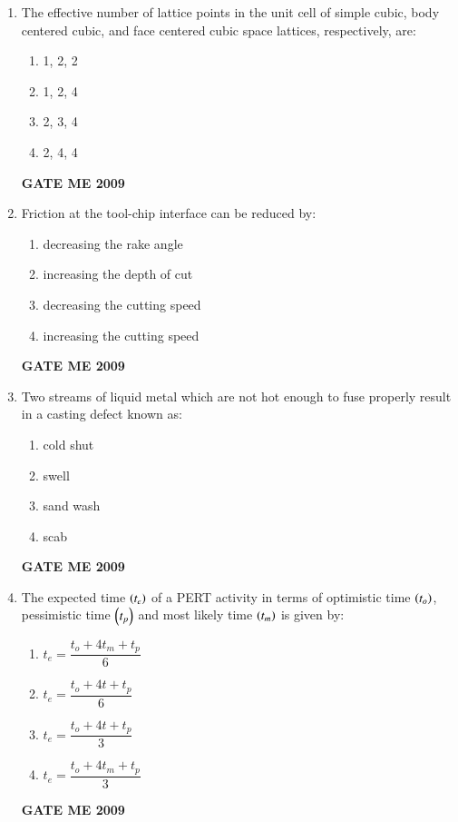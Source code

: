 \documentclass[journal]{IEEEtran}
\begin{document}
\begin{enumerate}[leftmargin=0pt]
\item The effective number of lattice points in the unit cell of simple cubic, body centered cubic, and face centered cubic space lattices, respectively, are:
  \begin{enumerate}[label=(\alph*)]
    \item 1, 2, 2
    \item 1, 2, 4
    \item 2, 3, 4
    \item 2, 4, 4
  \end{enumerate}
  \hfill{\textbf{GATE ME 2009}}


\item Friction at the tool-chip interface can be reduced by:
  \begin{enumerate}[label=(\alph*)]
    \item decreasing the rake angle
    \item increasing the depth of cut
    \item decreasing the cutting speed
    \item increasing the cutting speed
  \end{enumerate}
  \hfill{\textbf{GATE ME 2009}}


\item Two streams of liquid metal which are not hot enough to fuse properly result in a casting defect known as:
  \begin{enumerate}[label=(\alph*)]
    \item cold shut
    \item swell
    \item sand wash
    \item scab
  \end{enumerate}
  \hfill{\textbf{GATE ME 2009}}


\item The expected time $\left(t_e\right)$ of a PERT activity in terms of optimistic time $\left(t_o\right)$, pessimistic time $\left(t_p\right)$ and most likely time $\left(t_m\right)$ is given by:
  \begin{enumerate}[label=(\alph*)]
    \item $t_e = \dfrac{t_o + 4 t_m + t_p}{6}$
    \item $t_e = \dfrac{t_o + 4 t + t_p}{6}$
    \item $t_e = \dfrac{t_o + 4 t + t_p}{3}$
    \item $t_e = \dfrac{t_o + 4 t_m + t_p}{3}$
  \end{enumerate}
  \hfill{\textbf{GATE ME 2009}}


\end{enumerate}
\end{document}
